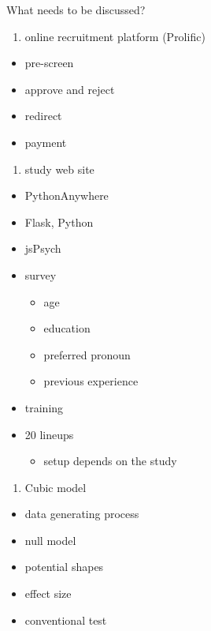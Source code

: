 \documentclass{monashthesis}
\theoremstyle{definition}
\theoremstyle{definition}
\theoremstyle{definition}
\theoremstyle{definition}
\theoremstyle{remark}
\begin{document}
What needs to be discussed?

\begin{enumerate}
\def\labelenumi{\arabic{enumi}.}
\tightlist
\item
  online recruitment platform (Prolific)
\end{enumerate}

\begin{itemize}
\tightlist
\item
  pre-screen
\item
  approve and reject
\item
  redirect
\item
  payment
\end{itemize}

\begin{enumerate}
\def\labelenumi{\arabic{enumi}.}
\setcounter{enumi}{1}
\tightlist
\item
  study web site
\end{enumerate}

\begin{itemize}
\tightlist
\item
  PythonAnywhere
\item
  Flask, Python
\item
  jsPsych
\item
  survey

  \begin{itemize}
  \tightlist
  \item
    age
  \item
    education
  \item
    preferred pronoun
  \item
    previous experience
  \end{itemize}
\item
  training
\item
  20 lineups

  \begin{itemize}
  \tightlist
  \item
    setup depends on the study
  \end{itemize}
\end{itemize}

\begin{enumerate}
\def\labelenumi{\arabic{enumi}.}
\setcounter{enumi}{2}
\tightlist
\item
  Cubic model
\end{enumerate}

\begin{itemize}
\tightlist
\item
  data generating process
\item
  null model
\item
  potential shapes
\item
  effect size
\item
  conventional test
\end{itemize}
\end{document}
